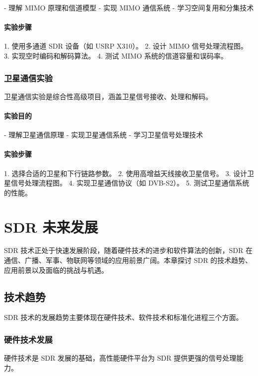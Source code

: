 \documentclass[UTF8]{ctexbook}
\begin{document}
- 理解 MIMO 原理和信道模型
- 实现 MIMO 通信系统
- 学习空间复用和分集技术

\subsubsection{实验步骤}

1. 使用多通道 SDR 设备（如 USRP X310）。
2. 设计 MIMO 信号处理流程图。
3. 实现空时编码和解码算法。
4. 测试 MIMO 系统的信道容量和误码率。

\subsection{卫星通信实验}

卫星通信实验是综合性高级项目，涵盖卫星信号接收、处理和解码。

\subsubsection{实验目的}

- 理解卫星通信原理
- 实现卫星通信系统
- 学习卫星信号处理技术

\subsubsection{实验步骤}

1. 选择合适的卫星和下行链路参数。
2. 使用高增益天线接收卫星信号。
3. 设计卫星信号处理流程图。
4. 实现卫星通信协议（如 DVB-S2）。
5. 测试卫星通信系统的性能。

\chapter{SDR 未来发展}

SDR 技术正处于快速发展阶段，随着硬件技术的进步和软件算法的创新，SDR 在通信、广播、军事、物联网等领域的应用前景广阔。本章探讨 SDR 的技术趋势、应用前景以及面临的挑战与机遇。

\section{技术趋势}

SDR 技术的发展趋势主要体现在硬件技术、软件技术和标准化进程三个方面。

\subsection{硬件技术发展}

硬件技术是 SDR 发展的基础，高性能硬件平台为 SDR 提供更强的信号处理能力。
\end{document}
